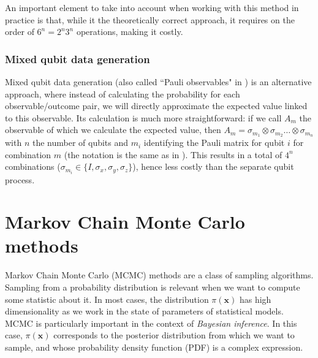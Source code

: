 \documentclass[12pt]{memoir}
\newcommand{\mb}{\mathbf}
\newcommand{\ti}{\textit}
\begin{document}
An important element to take into account when working with this method in practice is that, while it the theoretically correct approach, it requires on the order of $6^n = 2^n 3^n$ operations, making it costly.



\subsubsection*{Mixed qubit data generation}

Mixed qubit data generation (also called ``Pauli observables" in \cite{Guta20}) is an alternative approach, where instead of calculating the probability for each observable/outcome pair, we will directly approximate the expected value linked to this observable. Its calculation is much more straightforward: if we call $A_m$ the observable of which we calculate the expected value, then $A_m = \sigma_{m_1} \otimes \sigma_{m_2} \dots \otimes \sigma_{m_n}$ with $n$ the number of qubits and $m_i$ identifying the Pauli matrix for qubit $i$ for combination $m$ (the notation is the same as in \cite{meth:bayesian:Langevin:ACMT2024}). This results in a total of $4^n$ combinations ($\sigma_{m_i} \in \{I, \sigma_x, \sigma_y, \sigma_z\}$), hence less costly than the separate qubit process.

\newpage

\section{Markov Chain Monte Carlo methods}
Markov Chain Monte Carlo (MCMC) methods are a class of sampling algorithms. Sampling from a probability distribution is relevant when we want to compute some statistic about it. In most cases, the distribution $\pi(\mb x)$ has high dimensionality as we work in the state of parameters of statistical models. MCMC is particularly important in the context of \ti{Bayesian inference}. In this case, $\pi(\mb x)$ corresponds to the posterior distribution from which we want to sample, and whose probability density function (PDF) is a complex expression. \medbreak
\end{document}
